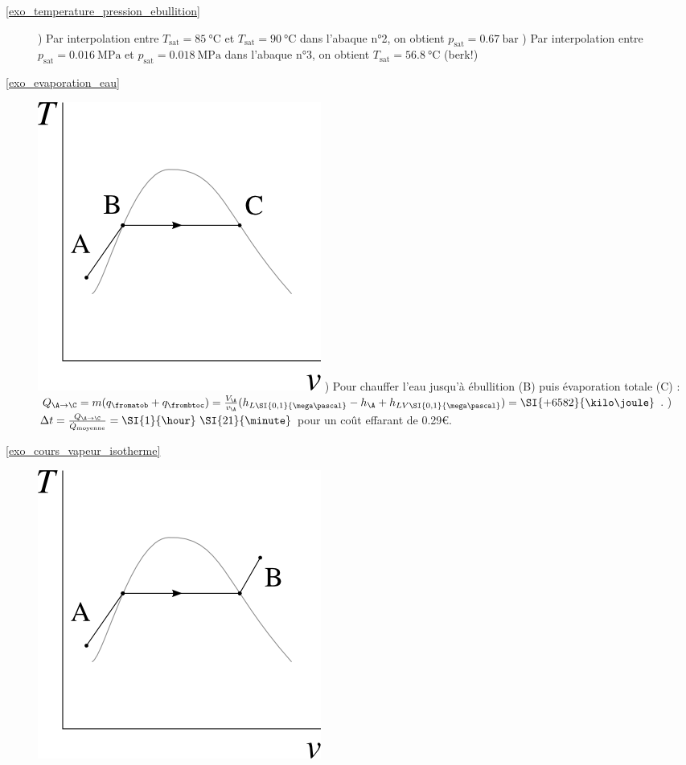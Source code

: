 \exercisesolutionpage
\titreresultats

\begin{description}
	\item [\ref{exo_temperature_pression_ebullition}] 
			) Par interpolation entre $T_\text{sat} = \SI{85}{\degreeCelsius}$ et $T_\text{sat} = \SI{90}{\degreeCelsius}$ dans l’abaque n°2, on obtient $p_\text{sat} = \SI{0,67}{\bar}$
			) Par interpolation entre $p_\text{sat} = \SI{0,016}{\mega\pascal}$ et $p_\text{sat} = \SI{0,018}{\mega\pascal}$ dans l’abaque n°3, on obtient $T_\text{sat} = \SI{56,8}{\degreeCelsius}$ (berk!)
	\item [\ref{exo_evaporation_eau}]
			\includegraphics[width=\solutiondiagramwidth]{images/ex_tv_ebullition.png}
			) Pour chauffer l’eau jusqu’à ébullition (B) puis évaporation totale (C) : $Q_{\A \to \C} = m (q_\fromatob + q_\frombtoc) = \frac{V_\A}{v_\A}(h_{L \SI{0,1}{\mega\pascal}} - h_\A + h_{LV \SI{0,1}{\mega\pascal}}) = \SI{+6582}{\kilo\joule}$. 
			) $\Delta t = \frac{Q_{\A \to \C}}{\dot Q_\text{moyenne}} = \SI{1}{\hour} ~\SI{21}{\minute}$ pour un coût effarant de \num{0,29}\euro{}.
	\item [\ref{exo_cours_vapeur_isotherme}]
			\includegraphics[width=\solutiondiagramwidth]{images/ex_tv_generation_vapeur.png}

\end{description}
